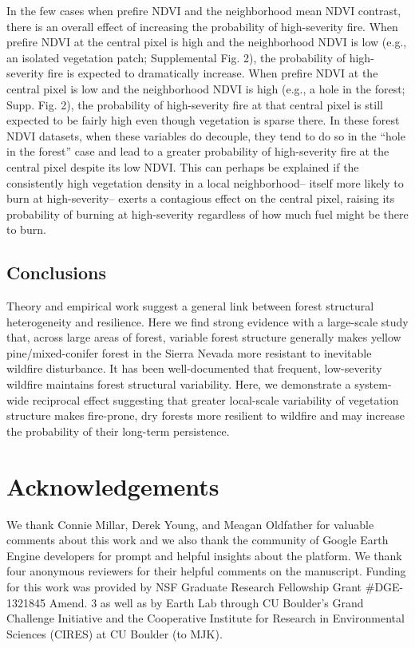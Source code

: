 \documentclass[]{article}
\begin{document}
In the few cases when prefire NDVI and the neighborhood mean NDVI
contrast, there is an overall effect of increasing the probability of
high-severity fire. When prefire NDVI at the central pixel is high and
the neighborhood NDVI is low (e.g., an isolated vegetation patch;
Supplemental Fig. 2), the probability of high-severity fire is expected
to dramatically increase. When prefire NDVI at the central pixel is low
and the neighborhood NDVI is high (e.g., a hole in the forest; Supp.
Fig. 2), the probability of high-severity fire at that central pixel is
still expected to be fairly high even though vegetation is sparse there.
In these forest NDVI datasets, when these variables do decouple, they
tend to do so in the ``hole in the forest'' case and lead to a greater
probability of high-severity fire at the central pixel despite its low
NDVI. This can perhaps be explained if the consistently high vegetation
density in a local neighborhood-- itself more likely to burn at
high-severity-- exerts a contagious effect on the central pixel, raising
its probability of burning at high-severity regardless of how much fuel
might be there to burn.

\hypertarget{conclusions}{%
\subsection{Conclusions}\label{conclusions}}

Theory and empirical work suggest a general link between forest
structural heterogeneity and resilience. Here we find strong evidence
with a large-scale study that, across large areas of forest, variable
forest structure generally makes yellow pine/mixed-conifer forest in the
Sierra Nevada more resistant to inevitable wildfire disturbance. It has
been well-documented that frequent, low-severity wildfire maintains
forest structural variability. Here, we demonstrate a system-wide
reciprocal effect suggesting that greater local-scale variability of
vegetation structure makes fire-prone, dry forests more resilient to
wildfire and may increase the probability of their long-term
persistence.

\hypertarget{acknowledgements}{%
\section{Acknowledgements}\label{acknowledgements}}

We thank Connie Millar, Derek Young, and Meagan Oldfather for valuable
comments about this work and we also thank the community of Google Earth
Engine developers for prompt and helpful insights about the platform. We
thank four anonymous reviewers for their helpful comments on the
manuscript. Funding for this work was provided by NSF Graduate Research
Fellowship Grant \#DGE- 1321845 Amend. 3 as well as by Earth Lab through
CU Boulder's Grand Challenge Initiative and the Cooperative Institute
for Research in Environmental Sciences (CIRES) at CU Boulder (to MJK).
\end{document}
